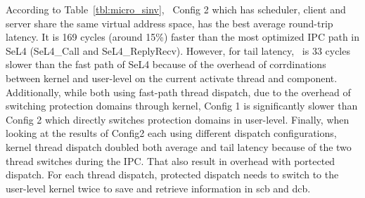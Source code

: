 

According to Table~\ref{tbl:micro_sinv}, \name\ Config 2 which has scheduler, client and server share the same virtual address space, has the best average round-trip latency.
It is 169 cycles (around 15\%) faster than the most optimized IPC path in SeL4 (SeL4\_Call and SeL4\_ReplyRecv).
However, for tail latency, \name\ is 33 cycles slower than the fast path of SeL4 because of the overhead of corrdinations between kernel and user-level on the current activate thread and component.
Additionally, while both using fast-path thread dispatch, due to the overhead of switching protection domains through kernel, Config 1 is significantly slower than Config 2 which directly switches protection domains in user-level.
Finally, when looking at the results of Config2 each using different dispatch configurations, kernel thread dispatch doubled both average and tail latency because of the two thread switches during the IPC.
That also result in overhead with portected dispatch.
For each thread dispatch, protected dispatch needs to switch to the user-level kernel twice to save and retrieve information in scb and dcb.


